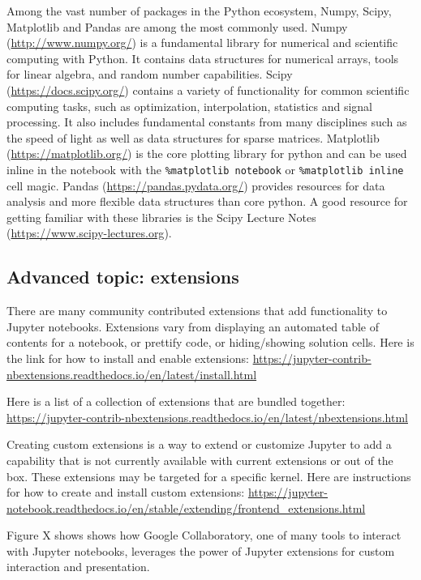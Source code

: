 \documentclass[]{book}
\begin{document}
Among the vast number of packages in the Python ecosystem, Numpy, Scipy,
Matplotlib and Pandas are among the most commonly used. Numpy
(\url{http://www.numpy.org/}) is a fundamental library for numerical and
scientific computing with Python. It contains data structures for
numerical arrays, tools for linear algebra, and random number
capabilities. Scipy (\url{https://docs.scipy.org/}) contains a variety
of functionality for common scientific computing tasks, such as
optimization, interpolation, statistics and signal processing. It also
includes fundamental constants from many disciplines such as the speed
of light as well as data structures for sparse matrices. Matplotlib
(\url{https://matplotlib.org/}) is the core plotting library for python
and can be used inline in the notebook with the
\texttt{\%matplotlib\ notebook} or \texttt{\%matplotlib\ inline} cell
magic. Pandas (\url{https://pandas.pydata.org/}) provides resources for
data analysis and more flexible data structures than core python. A good
resource for getting familiar with these libraries is the Scipy Lecture
Notes (\url{https://www.scipy-lectures.org}).

\subsection{Advanced topic: extensions}\label{advanced-topic-extensions}

There are many community contributed extensions that add functionality
to Jupyter notebooks. Extensions vary from displaying an automated table
of contents for a notebook, or prettify code, or hiding/showing solution
cells. Here is the link for how to install and enable extensions:
\url{https://jupyter-contrib-nbextensions.readthedocs.io/en/latest/install.html}

Here is a list of a collection of extensions that are bundled together:
\url{https://jupyter-contrib-nbextensions.readthedocs.io/en/latest/nbextensions.html}

Creating custom extensions is a way to extend or customize Jupyter to
add a capability that is not currently available with current extensions
or out of the box. These extensions may be targeted for a specific
kernel. Here are instructions for how to create and install custom
extensions:
\url{https://jupyter-notebook.readthedocs.io/en/stable/extending/frontend_extensions.html}

Figure X shows shows how Google Collaboratory, one of many tools to
interact with Jupyter notebooks, leverages the power of Jupyter
extensions for custom interaction and presentation.
\end{document}
